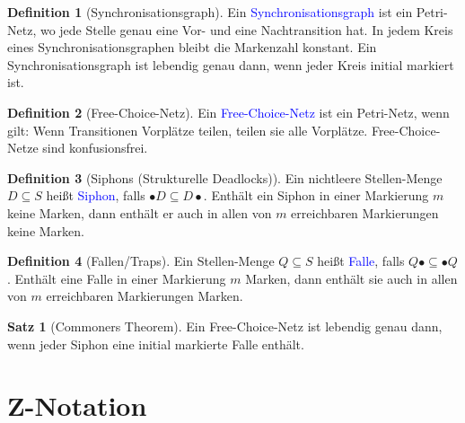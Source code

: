 \documentclass{scrreprt}
\theoremstyle{definition}
\newtheorem{Definition}{Definition}[section]
\newtheorem{Satz}{Satz}[section]
\theoremstyle{example}
\theoremstyle{algorithm}
\begin{document}
\begin{Definition}[Synchronisationsgraph]
Ein \textcolor{blue}{Synchronisationsgraph} ist ein Petri-Netz, wo jede Stelle genau eine Vor- und eine Nachtransition hat. In jedem Kreis eines Synchronisationsgraphen bleibt die Markenzahl konstant. Ein Synchronisationsgraph ist lebendig genau dann, wenn jeder Kreis initial markiert ist.
\end{Definition}

\begin{Definition}[Free-Choice-Netz]
Ein \textcolor{blue}{Free-Choice-Netz} ist ein Petri-Netz, wenn gilt: Wenn Transitionen Vorplätze teilen, teilen sie alle Vorplätze. Free-Choice-Netze sind konfusionsfrei.
\end{Definition}

\begin{Definition}[Siphons (Strukturelle Deadlocks)]
Ein nichtleere Stellen-Menge $D\subseteq S$ heißt \textcolor{blue}{Siphon}, falls $\bullet D \subseteq D\bullet$. Enthält ein Siphon in einer Markierung $m$ keine Marken, dann enthält er auch in allen von $m$ erreichbaren Markierungen keine Marken.
\end{Definition}

\begin{Definition}[Fallen/Traps]
Ein Stellen-Menge $Q\subseteq S$ heißt \textcolor{blue}{Falle}, falls $Q\bullet \subseteq \bullet Q$. Enthält eine Falle in einer Markierung $m$ Marken, dann enthält sie auch in allen von $m$ erreichbaren Markierungen Marken.
\end{Definition}

\begin{Satz}[Commoners Theorem]
Ein Free-Choice-Netz ist lebendig genau dann, wenn jeder Siphon eine initial markierte Falle enthält.
\end{Satz}

\section{Z-Notation}
\end{document}
